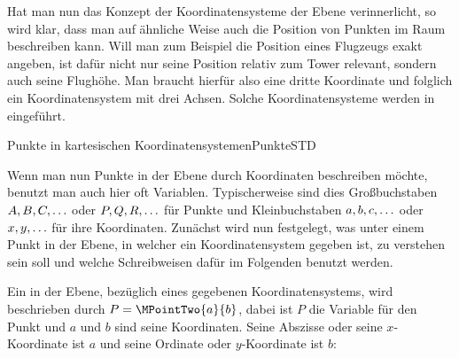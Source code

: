 \begin{MIntro}
Hat man nun das Konzept der Koordinatensysteme der Ebene verinnerlicht, so wird klar, dass man auf ähnliche Weise auch die Position von Punkten im Raum beschreiben kann. Will man zum Beispiel die Position eines Flugzeugs exakt angeben, ist dafür nicht nur seine Position relativ zum Tower relevant, sondern auch seine Flughöhe. Man braucht hierfür also eine dritte Koordinate und folglich ein Koordinatensystem mit drei Achsen. Solche Koordinatensysteme werden in  eingeführt.  

\end{MIntro}

\begin{MXContent}{Punkte in kartesischen Koordinatensystemen}{Punkte}{STD}

Wenn man nun Punkte in der Ebene durch Koordinaten beschreiben möchte, benutzt man auch hier oft Variablen. Typischerweise sind dies Großbuchstaben $A,B,C,\hdots$ oder $P,Q,R,\hdots$ für Punkte und Kleinbuchstaben $a,b,c,\hdots$ oder $x,y,\hdots$ für ihre Koordinaten. Zunächst wird nun festgelegt, was unter einem Punkt in der Ebene, in welcher ein Koordinatensystem gegeben ist, zu verstehen sein soll und welche Schreibweisen dafür im Folgenden benutzt werden. 

\begin{MInfo}
Ein  in der Ebene, bezüglich eines gegebenen Koordinatensystems, wird beschrieben durch $P=\MPointTwo{a}{b}$, dabei ist $P$ die Variable für den Punkt und $a$ und $b$ sind seine Koordinaten. Seine Abszisse oder seine $x$-Koordinate ist $a$ und seine Ordinate oder $y$-Koordinate ist $b$:

\begin{center}
\end{center}
\end{MInfo}
\end{MXContent}
